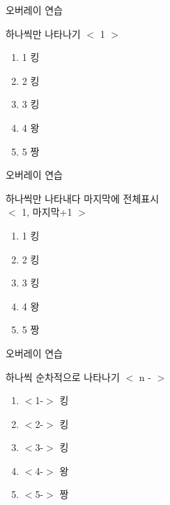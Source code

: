 \documentclass[10pt,xcolor=pdftex,dvipsnames,table,handout]{beamer}
\begin{document}
		\begin{frame}[t]{오버레이 연습}

			\begin{block} {하나씩만 나타나기 $<$ 1 $>$ }
			\begin{enumerate}
			\item <1> 1 킹
			\item <2> 2 킹
			\item <3> 3 킹
			\item <4> 4 왕
			\item <5> 5 짱
			\end{enumerate}
			\end{block} 

		\end{frame}

		\begin{frame}[t]{오버레이 연습}

			\begin{block} {하나씩만 나타내다 마지막에 전체표시\\
						$<$ 1, 마지막+1 $>$ }
			\begin{enumerate}
			\item <1,6> 1 킹
			\item <2,6> 2 킹
			\item <3,6> 3 킹
			\item <4,6> 4 왕
			\item <5,6> 5 짱
			\end{enumerate}
			\end{block} 

		\end{frame}




		\begin{frame}[t]{오버레이 연습}

			\begin{block} {하나씩 순차적으로 나타나기 $<$ n - $>$ }
			\begin{enumerate}
			\item <1-> $<$1-$>$ 킹
			\item <2-> $<$2-$>$ 킹
			\item <3-> $<$3-$>$ 킹
			\item <4-> $<$4-$>$ 왕
			\item <5-> $<$5-$>$ 짱
			\end{enumerate}
			\end{block}

		\end{frame}
\end{document}
